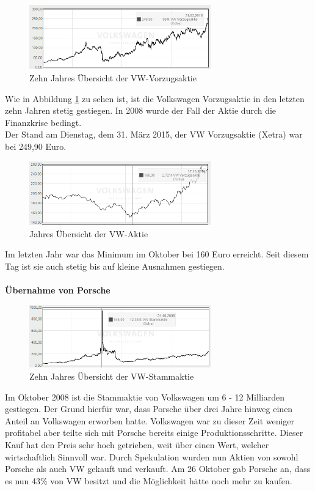 \documentclass[12pt]{article}
\begin{document}
\begin{figure}[here!]
\centering
\includegraphics[width=0.7\textwidth]{images/finanzen2015}
\caption{Zehn Jahres Übersicht der VW-Vorzugsaktie \cite{aktienfotos}}
\label{fig:vwaktie1}
\end{figure}\FloatBarrier
\noindent
Wie in Abbildung \ref{fig:vwaktie1} zu sehen ist, ist die Volkswagen Vorzugsaktie in den letzten zehn Jahren stetig gestiegen. In 2008 wurde der Fall der Aktie durch die Finanzkrise bedingt.\\
Der Stand am Dienstag, dem 31. März 2015, der VW Vorzugsaktie (Xetra) war bei 249,90 Euro.
\begin{figure}[here!]
\centering
\includegraphics[width=0.7\textwidth]{images/finanzen20151}
\caption{Jahres Übersicht der VW-Aktie \cite{aktienfotos}}
\label{fig:vwaktie3}
\end{figure}\FloatBarrier
\noindent
Im letzten Jahr war das Minimum im Oktober bei 160 Euro erreicht. Seit diesem Tag ist sie auch stetig bis auf kleine Ausnahmen gestiegen. \\\\
\textbf{Übernahme von Porsche}
\begin{figure}[here!]
\centering
\includegraphics[width=0.7\textwidth]{images/finanzen2015S}
\caption{Zehn Jahres Übersicht der VW-Stammaktie \cite{aktienfotos}}
\label{fig:vwaktie2}
\end{figure}\FloatBarrier
\noindent
Im Oktober 2008 ist die Stammaktie von Volkswagen um 6 - 12 Milliarden gestiegen. Der Grund hierfür war, dass Porsche über drei Jahre hinweg einen Anteil an Volkswagen erworben hatte. Volkswagen war zu dieser Zeit weniger profitabel aber teilte sich mit Porsche bereits einige Produktionsschritte. Dieser Kauf hat den Preis sehr hoch getrieben, weit über einen Wert, welcher wirtschaftlich Sinnvoll war. Durch Spekulation wurden nun Aktien von sowohl Porsche als auch VW gekauft und verkauft. Am 26 Oktober gab Porsche an, dass es nun 43\% von VW besitzt und die Möglichkeit hätte noch mehr zu kaufen. \\
\end{document}
